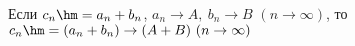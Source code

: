 
Если $c_n\hm=a_n+b_n$, $a_n\to A,\ b_n\to B$ $(n\to \infty)$, то $c_n\hm=(a_n+b_n)\to(A+B) \ (n\to\infty)$
